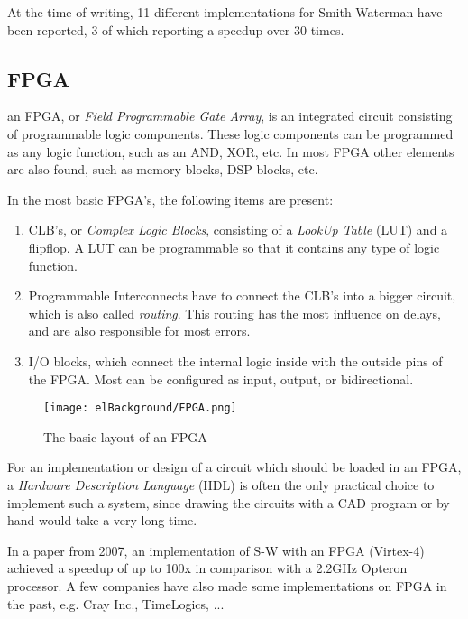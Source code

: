 At the time of writing, 11 different implementations for Smith-Waterman have been reported, 3 of which reporting a speedup over 30 times.

\subsection{FPGA}

an FPGA, or \emph{Field Programmable Gate Array}, is an integrated circuit consisting of programmable logic components. These logic components can be programmed as any logic function, such as an AND, XOR, etc. In most FPGA other elements are also found, such as memory blocks, DSP blocks, etc.

In the most basic FPGA's, the following items are present:
\begin{enumerate}
	\item CLB's, or \emph{Complex Logic Blocks}, consisting of a \emph{LookUp Table} (LUT) and a flipflop. A LUT can be programmable so that it contains any type of logic function.
	\item Programmable Interconnects have to connect the CLB's into a bigger circuit, which is also called \emph{routing}. This routing has the most influence on delays, and are also responsible for most errors.
	\item I/O blocks, which connect the internal logic inside with the outside pins of the FPGA. Most can be configured as input, output, or bidirectional.
\end{enumerate}

\begin{figure}[H]
	\centering
	\texttt{[image: elBackground/FPGA.png]}
	\caption{The basic layout of an FPGA}
	\label{fig:fpga}
\end{figure}

For an implementation or design of a circuit which should be loaded in an FPGA, a \emph{Hardware Description Language} (HDL) is often the only practical choice to implement such a system, since drawing the circuits with a CAD program or by hand would take a very long time.

In a paper from 2007, an implementation of S-W with an FPGA (Virtex-4) achieved a speedup of up to 100x in comparison with a 2.2GHz Opteron processor. %
A few companies have also made some implementations on FPGA in the past, e.g. Cray Inc., TimeLogics, ...

